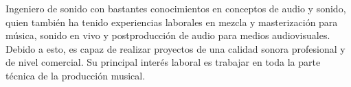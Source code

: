 
Ingeniero de sonido con bastantes conocimientos en conceptos de audio y sonido, quien también ha tenido experiencias laborales en mezcla y masterización para música, sonido en vivo y postproducción de audio para medios audiovisuales. Debido a esto, es capaz de realizar proyectos de una calidad sonora profesional y de nivel comercial. Su principal interés laboral es trabajar en toda la parte técnica de la producción musical. \\